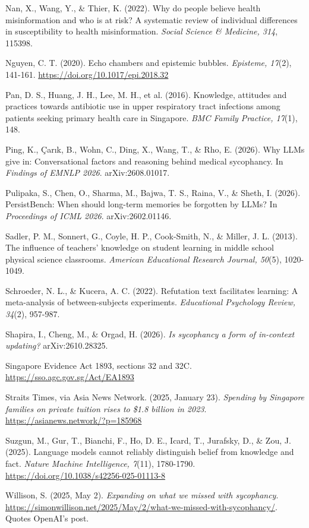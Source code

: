 Nan, X., Wang, Y., \& Thier, K. (2022). Why do people believe health misinformation and who is at risk? A systematic review of individual differences in susceptibility to health misinformation. \emph{Social Science \& Medicine, 314}, 115398.

Nguyen, C. T. (2020). Echo chambers and epistemic bubbles. \emph{Episteme, 17}(2), 141-161. \url{https://doi.org/10.1017/epi.2018.32}

Pan, D. S., Huang, J. H., Lee, M. H., et al. (2016). Knowledge, attitudes and practices towards antibiotic use in upper respiratory tract infections among patients seeking primary health care in Singapore. \emph{BMC Family Practice, 17}(1), 148.

Ping, K., \c{C}ar{\i}k, B., Wohn, C., Ding, X., Wang, T., \& Rho, E. (2026). Why LLMs give in: Conversational factors and reasoning behind medical sycophancy. In \emph{Findings of EMNLP 2026}. arXiv:2608.01017.

Pulipaka, S., Chen, O., Sharma, M., Bajwa, T. S., Raina, V., \& Sheth, I. (2026). PersistBench: When should long-term memories be forgotten by LLMs? In \emph{Proceedings of ICML 2026}. arXiv:2602.01146.

Sadler, P. M., Sonnert, G., Coyle, H. P., Cook-Smith, N., \& Miller, J. L. (2013). The influence of teachers' knowledge on student learning in middle school physical science classrooms. \emph{American Educational Research Journal, 50}(5), 1020-1049.

Schroeder, N. L., \& Kucera, A. C. (2022). Refutation text facilitates learning: A meta-analysis of between-subjects experiments. \emph{Educational Psychology Review, 34}(2), 957-987.

Shapira, I., Cheng, M., \& Orgad, H. (2026). \emph{Is sycophancy a form of in-context updating?} arXiv:2610.28325.

Singapore Evidence Act 1893, sections 32 and 32C. \url{https://sso.agc.gov.sg/Act/EA1893}

Straits Times, via Asia News Network. (2025, January 23). \emph{Spending by Singapore families on private tuition rises to \$1.8 billion in 2023}. \url{https://asianews.network/?p=185968}

Suzgun, M., Gur, T., Bianchi, F., Ho, D. E., Icard, T., Jurafsky, D., \& Zou, J. (2025). Language models cannot reliably distinguish belief from knowledge and fact. \emph{Nature Machine Intelligence, 7}(11), 1780-1790. \url{https://doi.org/10.1038/s42256-025-01113-8}

Willison, S. (2025, May 2). \emph{Expanding on what we missed with sycophancy}. \url{https://simonwillison.net/2025/May/2/what-we-missed-with-sycophancy/}. Quotes OpenAI's post.

